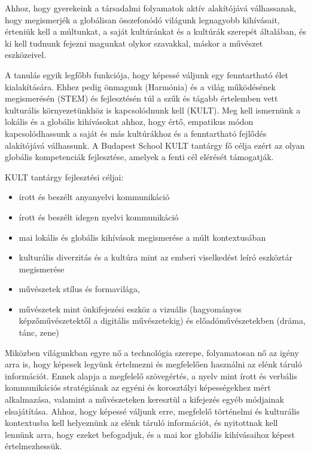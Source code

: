 Ahhoz, hogy gyerekeink a társadalmi folyamatok aktív alakítójává válhassanak, hogy megismerjék a globálisan összefonódó világunk legnagyobb kihívásait, érteniük kell a múltunkat, a saját kultúránkat és a kultúrák szerepét általában, és ki kell tudnunk fejezni magunkat olykor szavakkal, máskor a művészet eszközeivel.

A tanulás egyik legfőbb funkciója, hogy képessé váljunk egy fenntartható élet kialakítására. Ehhez pedig önmagunk (Harmónia) és a világ működésének megismerésén (STEM) és fejlesztésén túl a szűk és tágabb értelemben vett kulturális környezetünkhöz is kapcsolódnunk kell (KULT). Meg kell ismernünk a lokális és a globális kihívásokat ahhoz, hogy értő, empatikus módon kapcsolódhassunk a saját és más kultúrákhoz és a fenntartható fejlődés alakítójává válhassunk. A Budapest School KULT tantárgy fő célja ezért az olyan globális kompetenciák fejlesztése, amelyek a fenti cél elérését támogatják.

KULT tantárgy fejlesztési céljai:
\begin{itemize}
\item írott és beszélt anyanyelvi kommunikáció

\item írott és beszélt idegen nyelvi kommunikáció

\item mai lokális és globális kihívások megismerése a múlt kontextusában

\item kulturális diverzitás és a kultúra mint az emberi viselkedést leíró eszköztár megismerése

\item művészetek stílus és formavilága,

\item művészetek mint önkifejezési eszköz a vizuális (hagyományos képzőművészetektől a digitális művészetekig) és előadóművészetekben (dráma, tánc, zene)
\end{itemize}

Miközben világunkban egyre nő a technológia szerepe, folyamatosan nő az igény arra is, hogy képesek legyünk értelmezni és megfelelően használni az elénk táruló információt. Ennek alapja a megfelelő szövegértés, a nyelv mint írott és verbális kommunikációs stratégiának az egyéni és korosztályi képességekhez mért alkalmazása, valamint a művészeteken keresztül a kifejezés egyéb módjainak elsajátítása. Ahhoz, hogy képessé váljunk erre, megfelelő történelmi és kulturális kontextusba kell helyeznünk az elénk táruló információt, és nyitottnak kell lennünk arra, hogy ezeket befogadjuk, és a mai kor globális kihívásaihoz képest értelmezhessük.

